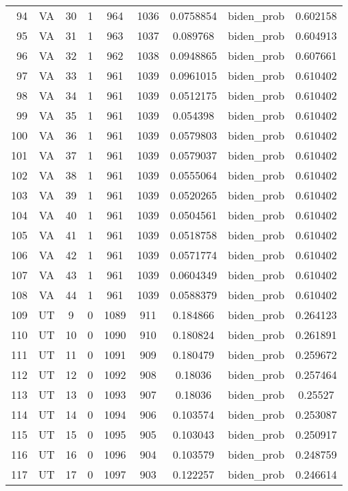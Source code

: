 \documentclass[12pt,a4paper]{article}
\begin{document}
\begin{tabular}{r|cccccccc}
	94 & VA & 30 & 1 & 964 & 1036 & 0.0758854 & biden\_prob & 0.602158 \\
	95 & VA & 31 & 1 & 963 & 1037 & 0.089768 & biden\_prob & 0.604913 \\
	96 & VA & 32 & 1 & 962 & 1038 & 0.0948865 & biden\_prob & 0.607661 \\
	97 & VA & 33 & 1 & 961 & 1039 & 0.0961015 & biden\_prob & 0.610402 \\
	98 & VA & 34 & 1 & 961 & 1039 & 0.0512175 & biden\_prob & 0.610402 \\
	99 & VA & 35 & 1 & 961 & 1039 & 0.054398 & biden\_prob & 0.610402 \\
	100 & VA & 36 & 1 & 961 & 1039 & 0.0579803 & biden\_prob & 0.610402 \\
	101 & VA & 37 & 1 & 961 & 1039 & 0.0579037 & biden\_prob & 0.610402 \\
	102 & VA & 38 & 1 & 961 & 1039 & 0.0555064 & biden\_prob & 0.610402 \\
	103 & VA & 39 & 1 & 961 & 1039 & 0.0520265 & biden\_prob & 0.610402 \\
	104 & VA & 40 & 1 & 961 & 1039 & 0.0504561 & biden\_prob & 0.610402 \\
	105 & VA & 41 & 1 & 961 & 1039 & 0.0518758 & biden\_prob & 0.610402 \\
	106 & VA & 42 & 1 & 961 & 1039 & 0.0571774 & biden\_prob & 0.610402 \\
	107 & VA & 43 & 1 & 961 & 1039 & 0.0604349 & biden\_prob & 0.610402 \\
	108 & VA & 44 & 1 & 961 & 1039 & 0.0588379 & biden\_prob & 0.610402 \\
	109 & UT & 9 & 0 & 1089 & 911 & 0.184866 & biden\_prob & 0.264123 \\
	110 & UT & 10 & 0 & 1090 & 910 & 0.180824 & biden\_prob & 0.261891 \\
	111 & UT & 11 & 0 & 1091 & 909 & 0.180479 & biden\_prob & 0.259672 \\
	112 & UT & 12 & 0 & 1092 & 908 & 0.18036 & biden\_prob & 0.257464 \\
	113 & UT & 13 & 0 & 1093 & 907 & 0.18036 & biden\_prob & 0.25527 \\
	114 & UT & 14 & 0 & 1094 & 906 & 0.103574 & biden\_prob & 0.253087 \\
	115 & UT & 15 & 0 & 1095 & 905 & 0.103043 & biden\_prob & 0.250917 \\
	116 & UT & 16 & 0 & 1096 & 904 & 0.103579 & biden\_prob & 0.248759 \\
	117 & UT & 17 & 0 & 1097 & 903 & 0.122257 & biden\_prob & 0.246614 \\

\end{tabular}
\end{document}
